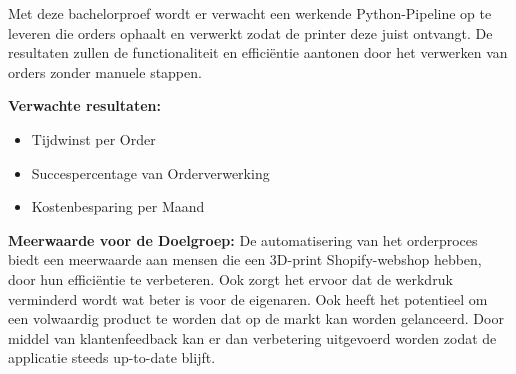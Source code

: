 Met deze bachelorproef wordt er verwacht een werkende Python-Pipeline op te leveren die orders ophaalt en verwerkt zodat de printer deze juist ontvangt. De resultaten zullen de functionaliteit en efficiëntie aantonen door het verwerken van orders zonder manuele stappen.

\vspace{1em}
\textbf{Verwachte resultaten:}
\begin{itemize}
\item Tijdwinst per Order
\item Succespercentage van Orderverwerking
\item Kostenbesparing per Maand
\end{itemize}

\textbf{Meerwaarde voor de Doelgroep:}
De automatisering van het orderproces biedt een meerwaarde aan mensen die een 3D-print Shopify-webshop hebben, door hun efficiëntie te verbeteren. Ook zorgt het ervoor dat de werkdruk verminderd wordt wat beter is voor de eigenaren. Ook heeft het potentieel om een volwaardig product te worden dat op de markt kan worden gelanceerd. Door middel van klantenfeedback kan er dan verbetering uitgevoerd worden zodat de applicatie steeds up-to-date blijft.








